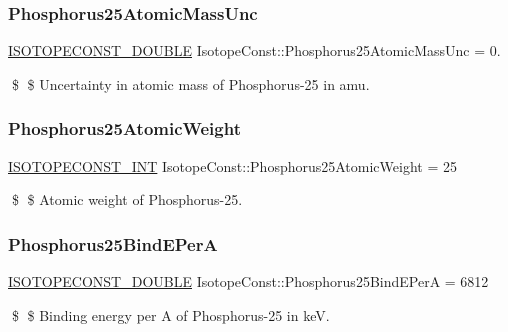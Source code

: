 \subsubsection{\texorpdfstring{Phosphorus25\+Atomic\+Mass\+Unc}{Phosphorus25AtomicMassUnc}}
{\footnotesize\ttfamily \mbox{\hyperlink{group___isotope_const-_macros_ga8f45a7272ce02c0b4c65c44636ed719a}{I\+S\+O\+T\+O\+P\+E\+C\+O\+N\+S\+T\+\_\+\+D\+O\+U\+B\+LE}} Isotope\+Const\+::\+Phosphorus25\+Atomic\+Mass\+Unc = 0.}

\$ \$ Uncertainty in atomic mass of Phosphorus-\/25 in amu. \mbox{\label{group___isotope_const-_phosphorus-_p25_ga40ed02d9787d031adb076afaa76d43f8}} 
\subsubsection{\texorpdfstring{Phosphorus25\+Atomic\+Weight}{Phosphorus25AtomicWeight}}
{\footnotesize\ttfamily \mbox{\hyperlink{group___isotope_const-_macros_ga5f18360b3e99483a35c32d789e62621c}{I\+S\+O\+T\+O\+P\+E\+C\+O\+N\+S\+T\+\_\+\+I\+NT}} Isotope\+Const\+::\+Phosphorus25\+Atomic\+Weight = 25}

\$ \$ Atomic weight of Phosphorus-\/25. \mbox{\label{group___isotope_const-_phosphorus-_p25_gab417f39f1d1c8320ef5b78cb5c46d8e1}} 
\subsubsection{\texorpdfstring{Phosphorus25\+Bind\+E\+PerA}{Phosphorus25BindEPerA}}
{\footnotesize\ttfamily \mbox{\hyperlink{group___isotope_const-_macros_ga8f45a7272ce02c0b4c65c44636ed719a}{I\+S\+O\+T\+O\+P\+E\+C\+O\+N\+S\+T\+\_\+\+D\+O\+U\+B\+LE}} Isotope\+Const\+::\+Phosphorus25\+Bind\+E\+PerA = 6812}

\$ \$ Binding energy per A of Phosphorus-\/25 in keV. \mbox{\label{group___isotope_const-_phosphorus-_p25_gaf347b3342e4a2a626bf43e845e16ee38}} 
